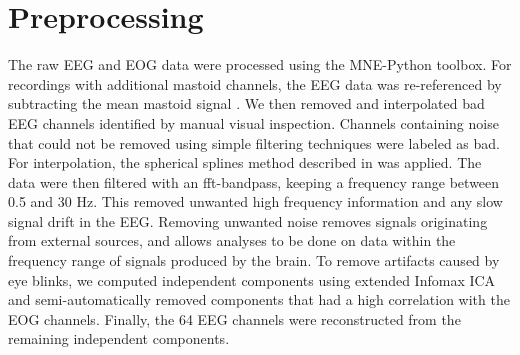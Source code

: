 \section{Preprocessing}
The raw EEG and EOG data were processed using the MNE-Python toolbox. 
For recordings with additional mastoid channels, the EEG data was re-referenced by subtracting the mean mastoid signal \cite{teplan_fundamentals_2002}.
We then removed and interpolated bad EEG channels identified by manual visual inspection. 
Channels containing noise that could not be removed using simple filtering techniques were labeled as bad. 
For interpolation, the spherical splines method described in \cite{perrin_spherical_1989} was applied.
The data were then filtered with an fft-bandpass, keeping a frequency range between 0.5 and 30 Hz.
This removed unwanted high frequency information and any slow signal drift in the EEG.
Removing unwanted noise removes signals originating from external sources, and allows analyses to be done on data within the frequency range of signals produced by the brain. 
To remove artifacts caused by eye blinks, we computed independent components using extended Infomax \ac{ICA} \cite{lee_independent_1999} and semi-automatically removed components that had a high correlation with the EOG channels.
Finally, the 64 EEG channels were reconstructed from the remaining independent components.